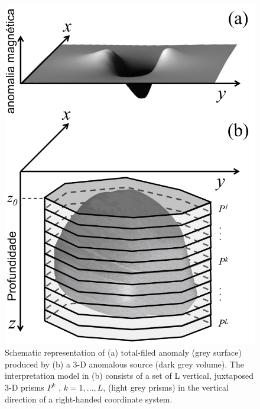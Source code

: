 \begin{figure}
    \centering
    \includegraphics[scale=0.3]{figures/observed_data.png}
    \caption{Schematic representation of (a) total-filed anomaly (grey surface) produced by (b) a 3-D anomalous source (dark grey volume). The interpretation model in (b) consists of a set of L vertical, juxtaposed 3-D prisms $P^k$ , $k = 1,\dots, L$, (light grey prisms) in the vertical direction of a right-handed coordinate system.}
    \label{fig:obs}
\end{figure}

